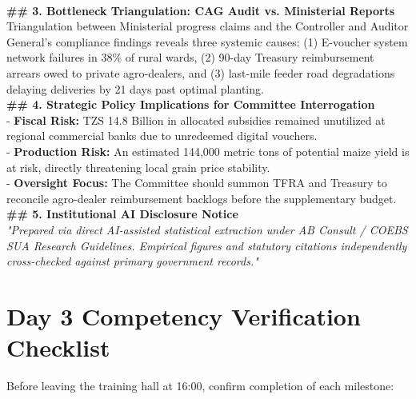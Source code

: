 \documentclass[11pt, a4paper]{report}
\begin{document}
\begin{tcolorbox}[colback=lightgrey, colframe=bordergrey, title=\textbf{Deliverable 3 Preview: \texttt{Day3\_Sector\_Evidence\_Dossier.md}}]
\begin{tabular}{lrrrr}
\bottomrule
\end{tabular}\\[0.2cm]
\textbf{\#\# 3. Bottleneck Triangulation: CAG Audit vs. Ministerial Reports}\\
Triangulation between Ministerial progress claims and the Controller and Auditor General's compliance findings reveals three systemic causes: (1) E-voucher system network failures in 38\% of rural wards, (2) 90-day Treasury reimbursement arrears owed to private agro-dealers, and (3) last-mile feeder road degradations delaying deliveries by 21 days past optimal planting.\\[0.2cm]
\textbf{\#\# 4. Strategic Policy Implications for Committee Interrogation}\\
- \textbf{Fiscal Risk:} TZS 14.8 Billion in allocated subsidies remained unutilized at regional commercial banks due to unredeemed digital vouchers.\\
- \textbf{Production Risk:} An estimated 144,000 metric tons of potential maize yield is at risk, directly threatening local grain price stability.\\
- \textbf{Oversight Focus:} The Committee should summon TFRA and Treasury to reconcile agro-dealer reimbursement backlogs before the supplementary budget.\\[0.2cm]
\textbf{\#\# 5. Institutional AI Disclosure Notice}\\
\textit{"Prepared via direct AI-assisted statistical extraction under AB Consult / COEBS SUA Research Guidelines. Empirical figures and statutory citations independently cross-checked against primary government records."}
\end{tcolorbox}

\section{Day 3 Competency Verification Checklist}
Before leaving the training hall at 16:00, confirm completion of each milestone:
\end{document}
